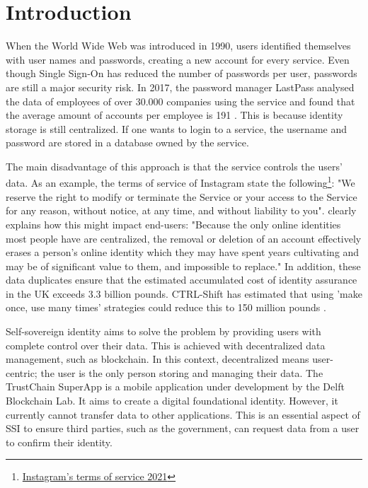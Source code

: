 \section{Introduction}
When the World Wide Web was introduced in 1990, users identified themselves with user names and passwords, creating a new account for every service. Even though Single Sign-On has reduced the number of passwords per user, passwords are still a major security risk. In 2017, the password manager LastPass analysed the data of employees of over 30.000 companies using the service and found that the average amount of accounts per employee is 191 \cite{lastpass}. This is because identity storage is still centralized. If one wants to login to a service, the username and password are stored in a database owned by the service. 

The main disadvantage of this approach is that the service controls the users' data. As an example, the terms of service of Instagram state the following\footnote{\href{https://help.instagram.com/430517971668717}{Instagram's terms of service 2021}}: "We reserve the right to modify or terminate the Service or your access to the Service for any reason, without notice, at any time, and without liability to you". \cite{sovrin} clearly explains how this might impact end-users: "Because the only online identities most people have are centralized, the removal or deletion of an account effectively erases a person’s online identity which they may have spent years cultivating and may be of significant value to them, and impossible to replace." In addition, these data duplicates ensure that the estimated accumulated cost of identity assurance in the UK exceeds 3.3 billion pounds. CTRL-Shift has estimated that using 'make once, use many times' strategies could reduce this to 150 million pounds \cite{ctrl-shift}.

Self-sovereign identity aims to solve the problem by providing users with complete control over their data. This is achieved with decentralized data management, such as blockchain. In this context, decentralized means user-centric; the user is the only person storing and managing their data. The TrustChain SuperApp \cite{superapp} is a mobile application under development by the Delft Blockchain Lab. It aims to create a digital foundational identity. However, it currently cannot transfer data to other applications. This is an essential aspect of SSI to ensure third parties, such as the government, can request data from a user to confirm their identity.

